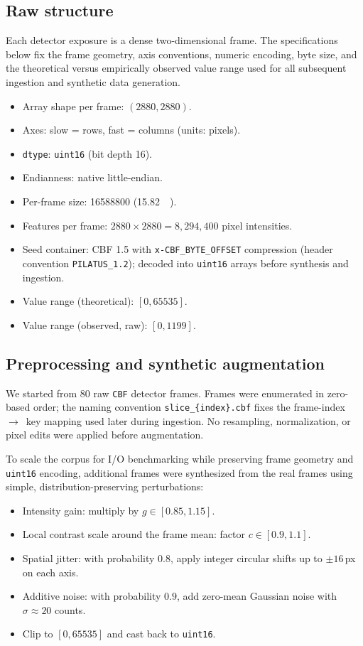 \documentclass[nomenclature, english, bibtex]{kththesis}
\numberwithin{listing}{chapter}
\begin{document}
\subsection{Raw structure}
Each detector exposure is a dense two-dimensional frame. The specifications below fix the frame geometry, axis conventions, numeric encoding, byte size, and the theoretical versus empirically observed value range used for all subsequent ingestion and synthetic data generation.

\begin{itemize}
  \item Array shape per frame: $(2880, 2880)$.
  \item Axes: slow = rows, fast = columns (units: pixels).
  \item \texttt{dtype}: \texttt{uint16} (bit depth 16).
  \item Endianness: native little-endian.
  \item Per-frame size: \SI{16588800}{\byte} (\SI{15.82}{\mebi\byte}).
  \item Features per frame: $2880\times2880=8{,}294{,}400$ pixel intensities.
  \item Seed container: \gls{CBF} 1.5 with \texttt{x-CBF\_BYTE\_OFFSET} compression (header convention \texttt{PILATUS\_1.2}); decoded into \texttt{uint16} arrays before synthesis and ingestion.
  \item Value range (theoretical): $[0, 65535]$.
  \item Value range (observed, raw): $[0, 1199]$.
\end{itemize}

\subsection{Preprocessing and synthetic augmentation}
We started from $80$ raw \texttt{CBF} detector frames. Frames were enumerated in zero-based order; the naming convention \texttt{slice\_\{index\}.cbf} fixes the frame-index \,$\rightarrow$\, key mapping used later during ingestion. No resampling, normalization, or pixel edits were applied before augmentation.

To scale the corpus for I/O benchmarking while preserving frame geometry and \texttt{uint16} encoding, additional frames were synthesized from the real frames using simple, distribution-preserving perturbations:

\begin{itemize}
  \item Intensity gain: multiply by $g\in[0.85,1.15]$.
  \item Local contrast scale around the frame mean: factor $c\in[0.9,1.1]$.
  \item Spatial jitter: with probability $0.8$, apply integer circular shifts up to $\pm16$\,px on each axis.
  \item Additive noise: with probability $0.9$, add zero-mean Gaussian noise with $\sigma\approx 20$ counts.
  \item Clip to $[0,65535]$ and cast back to \texttt{uint16}.
\end{itemize}
\end{document}
